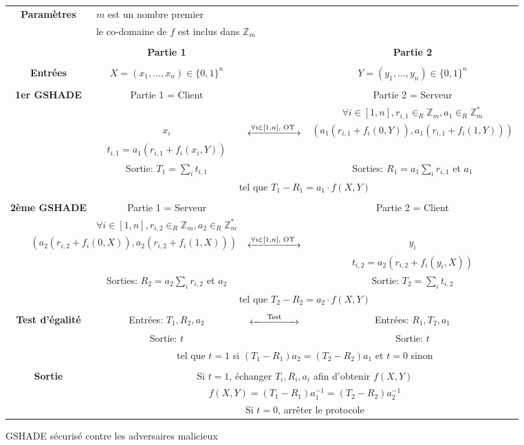 \documentclass{article}
\begin{document}
\begin{figure}[h]
\centering
\begin{tabular}{|cccc|}
\hline
\textbf{Paramètres} & \multicolumn{3}{l|}{$m$ est un nombre premier} \\
 & \multicolumn{3}{l|}{le co-domaine de $f$ est inclus dans $\mathbb{Z}_m$}\\
 & & & \\
& \textbf{Partie 1} & & \textbf{Partie 2}\\
 & & & \\
\textbf{Entrées} & $X=(x_1,...,x_n) \in \{0,1\}^n$ & & $Y=(y_1,...,y_n) \in \{0,1\}^n$ \\
 & & & \\
\textbf{1er GSHADE} & Partie 1 = Client & & Partie 2 = Serveur \\
 &  & & $\forall i \in [1,n], r_{i,1} \in _R \mathbb{Z}_m, a_1 \in _R \mathbb{Z}_m^* $  \\
 & $x_i$ & $\xleftrightarrow{\forall i \in [1,n], \text{ OT }}$ & $\left( a_1(r_{i,1} + f_i(0,Y)), a_1(r_{i,1} + f_i(1,Y)) \right)$ \\
 & $t_{i,1} = a_1 (r_{i,1} + f_i(x_i,Y))$ & & \\
 & Sortie: $T_1 = \sum_i t_{i,1}$ & & Sorties: $R_1 = a_1 \sum_i r_{i,1}$ et $a_1$ \\
 & \multicolumn{3}{c|}{tel que $T_1-R_1 = a_1 \cdot f(X,Y)$} \\
  & & & \\
\textbf{2ème GSHADE} & Partie 1 = Serveur & & Partie 2 = Client \\
 & $\forall i \in [1,n], r_{i,2} \in _R \mathbb{Z}_m, a_2 \in _R \mathbb{Z}_m^* $ & &   \\
\multicolumn{2}{|r}{$\left( a_2(r_{i,2} + f_i(0,X)), a_2(r_{i,2} + f_i(1,X)) \right)$} & $\xleftrightarrow{\forall i \in [1,n], \text{ OT }}$ & $y_i$ \\
 & & & $t_{i,2} = a_2 (r_{i,2} + f_i(y_i,X))$ \\
 & Sorties: $R_2 = a_2 \sum_i r_{i,2}$ et $a_2$ & & Sortie: $T_2 =  \sum_i t_{i,2}$ \\
 & \multicolumn{3}{c|}{tel que $T_2-R_2 = a_2 \cdot f(X,Y)$} \\
  & & & \\
\textbf{Test d'égalité} & Entrées: $T_1, R_2, a_2$ & $\xleftrightarrow{\hspace{0.5cm} \text{Test} \hspace{0.5cm}}$ & Entrées: $R_1, T_2, a_1$\\
 & Sortie: $t$ & & Sortie: $t$ \\
 & \multicolumn{3}{c|}{tel que $t=1$ si $(T_1-R_1)a_2 = (T_2-R_2)a_1$ et $t=0$ sinon} \\ 
  & & & \\
\textbf{Sortie} & \multicolumn{3}{c|}{Si $t=1$, échanger $T_i, R_i, a_i$ afin d'obtenir $f(X,Y)$}\\
 & \multicolumn{3}{c|}{$f(X,Y) = (T_1-R_1)a_1^{-1} = (T_2-R_2)a_2^{-1}$} \\
 & \multicolumn{3}{c|}{Si $t=0$, arrêter le protocole} \\
\hline
\end{tabular}
\captionsetup{labelformat=empty}
\caption{GSHADE sécurisé contre les adversaires malicieux}
\end{figure}
\end{document}

